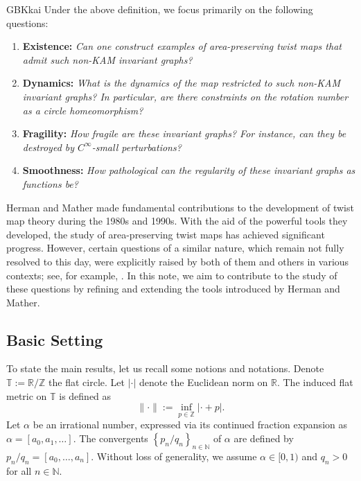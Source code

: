 \documentclass{amsart}
\theoremstyle{definition}
\begin{document}
\begin{CJK*}{GBK}{kai}
Under the above definition, we focus primarily on the following questions:
\begin{enumerate}
\item[(I)] \textbf{Existence:} \textit{Can one construct examples of area-preserving twist maps that admit such non-KAM invariant graphs?}

\item[(II)] \textbf{Dynamics:} \textit{What is the dynamics of the map restricted to such non-KAM invariant graphs? In particular, are there constraints on the rotation number as a circle homeomorphism?}

\item[(III)] \textbf{Fragility:} \textit{How fragile are these invariant graphs? For instance, can they be destroyed by $C^\infty$-small perturbations?}

\item[(IV)] \textbf{Smoothness:} \textit{How pathological can the regularity of these invariant graphs as functions be?}
\end{enumerate}

		Herman and Mather made fundamental contributions to the development of twist map theory during the 1980s and 1990s. With the aid of the powerful tools they developed, the study of area-preserving twist maps has achieved significant progress. However, certain questions of a similar nature, which remain not fully resolved to this day, were explicitly raised by both of them and others in various contexts; see, for example, \cite{FKO, H98, MY}. In this note, we aim to contribute to the study of these questions by refining and extending the tools introduced by Herman and Mather.
	\vspace{1ex}	
\subsection{Basic Setting}		
	To state the main results, let us recall some notions and notations. Denote \( \mathbb{T} := \mathbb{R}/\mathbb{Z} \) the flat circle. Let \( |\cdot| \) denote the Euclidean norm on \( \mathbb{R} \). The induced flat metric on \( \mathbb{T} \) is defined as
		\[
		\|\cdot\| := \inf_{p \in \mathbb{Z}} |\cdot + p|.
		\]
		Let \( \alpha \) be an irrational number, expressed via its continued fraction expansion as \( \alpha = [a_0, a_1, \ldots] \). The convergents \( \left\{ {p_n}/{q_n} \right\}_{n \in \mathbb{N}} \) of \( \alpha \) are defined by \( {p_n}/{q_n} = [a_0, \ldots, a_n] \). Without loss of generality, we assume \( \alpha \in [0, 1) \) and \( q_n > 0 \) for all \( n \in \mathbb{N} \).
		

\end{CJK*}
\end{document}
